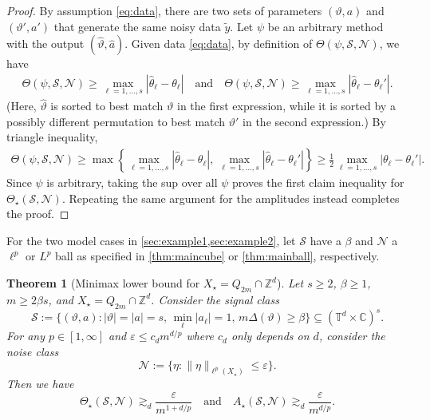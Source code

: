 \documentclass[11pt]{article}
\newtheorem{theorem}{Theorem}
\theoremstyle{definition}
\numberwithin{theorem}{section}
\numberwithin{lemma}{section}
\numberwithin{equation}{section}
\def\C{\mathbb{C}}
\def\T{\mathbb{T}}
\def\Z{\mathbb{Z}}
\renewcommand{\subset}{\subseteq}
\renewcommand{\hat}{\widehat}
\renewcommand{\tilde}{\widetilde}
\renewcommand{\epsilon}{\varepsilon}
\newcommand{\bfa}{a}
\newcommand{\calS}{\mathcal{S}}
\newcommand{\calN}{\mathcal{N}}
\def\andspace{\quad\text{and}\quad}
\numberwithin{equation}{section}
\begin{document}
	\begin{proof}
		By assumption \eqref{eq:data}, there are two sets of parameters $(\vartheta,\bfa)$ and $(\vartheta',\bfa')$ that generate the same noisy data $\tilde y$. Let $\psi$ be an arbitrary method with the output $(\hat\vartheta,\hat\bfa)$. Given data \eqref{eq:data}, by definition of $\Theta(\psi,\calS,\calN)$, we have
		\begin{align*}
			\Theta(\psi,\calS,\calN)
			\geq \max_{\ell=1,\dots,s} |\hat \theta_\ell-\theta_\ell| \andspace
			\Theta(\psi,\calS,\calN) \geq \max_{\ell=1,\dots,s} |\hat \theta_\ell-\theta_\ell'|. 
		\end{align*}
		(Here, $\hat\vartheta$ is sorted to best match $\vartheta$ in the first expression, while it is sorted by a possibly different permutation to best match $\vartheta'$ in the second expression.) By triangle inequality,
		\begin{align*}
			\Theta(\psi,\calS,\calN)
			\geq \max\left\{ \max_{\ell=1,\dots,s} |\hat \theta_\ell-\theta_\ell|, \, \max_{\ell=1,\dots,s} |\hat \theta_\ell-\theta_\ell'| \right\}
			\geq \frac 1 2 \max_{\ell=1,\dots,s} |\theta_\ell-\theta_\ell'|. 
		\end{align*}
		Since $\psi$ is arbitrary, taking the sup over all $\psi$ proves the first claim inequality for $\Theta_\star(\calS,\calN)$. Repeating the same argument for the amplitudes instead completes the proof. 
	\end{proof}
	
For  the two model cases in \cref{sec:example1,sec:example2}, let  $\calS$  have a $\beta$ and $\calN$ a $\ell^p$  or $L^p$ ball as specified  in \cref{thm:maincube} or \cref{thm:mainball}, respectively. 
	
	\begin{theorem}[Minimax lower bound for $X_\star = Q_{2m}\cap\Z^d$]
		\label{thm:minimaxp}
		Let $s\geq 2$, $\beta\geq 1$, $m\geq 2\beta s$, and $X_\star = Q_{2m}\cap\Z^d$. Consider the signal class
		$$
		\calS:=\big\{(\vartheta,\bfa) \colon |\vartheta|=|\bfa|=s, \, \min_\ell |a_\ell|=1, \, m\Delta(\vartheta)\geq \beta \big\}\subset (\T^d\times \C)^s. 
		$$
		For any $p\in [1,\infty]$ and $\epsilon\leq c_d m^{d/p}$ where $c_d$ only depends on $d$, consider the noise class
		$$
		\calN:= \{\eta\colon \|\eta\|_{\ell^p(X_\star)}\leq \epsilon\}.
		$$
		Then we have
		\begin{equation*}
			\Theta_\star(\calS,\calN) \gtrsim_d \frac{\epsilon}{ m^{1+d/p}} \andspace
			A_\star(\calS,\calN)  \gtrsim_d \frac{\epsilon}{m^{d/p}}.
		\end{equation*}
	\end{theorem}
	
\end{document}
